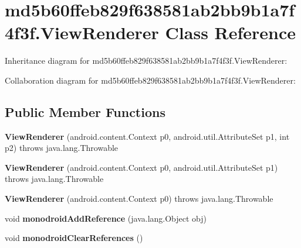 \hypertarget{classmd5b60ffeb829f638581ab2bb9b1a7f4f3f_1_1_view_renderer}{}\section{md5b60ffeb829f638581ab2bb9b1a7f4f3f.\+View\+Renderer Class Reference}
\label{classmd5b60ffeb829f638581ab2bb9b1a7f4f3f_1_1_view_renderer}


Inheritance diagram for md5b60ffeb829f638581ab2bb9b1a7f4f3f.\+View\+Renderer\+:


Collaboration diagram for md5b60ffeb829f638581ab2bb9b1a7f4f3f.\+View\+Renderer\+:
\subsection*{Public Member Functions}
\begin{DoxyCompactItemize}
\item 
\mbox{\label{classmd5b60ffeb829f638581ab2bb9b1a7f4f3f_1_1_view_renderer_a7824854b6d56615c217020e835a18df7}} 
{\bfseries View\+Renderer} (android.\+content.\+Context p0, android.\+util.\+Attribute\+Set p1, int p2)  throws java.\+lang.\+Throwable 	
\item 
\mbox{\label{classmd5b60ffeb829f638581ab2bb9b1a7f4f3f_1_1_view_renderer_adb13c4a3014dd0c910b8ccf98f0c66c8}} 
{\bfseries View\+Renderer} (android.\+content.\+Context p0, android.\+util.\+Attribute\+Set p1)  throws java.\+lang.\+Throwable 	
\item 
\mbox{\label{classmd5b60ffeb829f638581ab2bb9b1a7f4f3f_1_1_view_renderer_a6c38e734de3e5855f03713824966678f}} 
{\bfseries View\+Renderer} (android.\+content.\+Context p0)  throws java.\+lang.\+Throwable 	
\item 
\mbox{\label{classmd5b60ffeb829f638581ab2bb9b1a7f4f3f_1_1_view_renderer_a9ce576208d6e67c5201f21b67a8baf34}} 
void {\bfseries monodroid\+Add\+Reference} (java.\+lang.\+Object obj)
\item 
\mbox{\label{classmd5b60ffeb829f638581ab2bb9b1a7f4f3f_1_1_view_renderer_aa03a52443eaab5b1890013945129a8e2}} 
void {\bfseries monodroid\+Clear\+References} ()
\end{DoxyCompactItemize}
